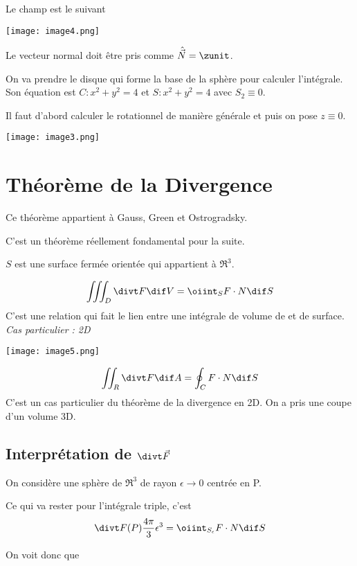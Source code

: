 Le champ est le suivant
\begin{center}

\texttt{[image: image4.png]}\\
\end{center}
Le vecteur normal doit être pris comme $\hat{\vec N} = \zunit$.

On va prendre le disque qui forme la base de la sphère pour calculer l'intégrale. Son équation est $C : x^2 + y^2 = 4 $  et $S : x^2 + y^2 = 4 $ avec $S_2 \equiv 0 $.


Il faut d'abord calculer le rotationnel de manière générale et puis on pose $z\equiv 0$.

\texttt{[image: image3.png]}\\

\section{Théorème de la Divergence}
Ce théorème appartient à Gauss, Green et Ostrogradsky.

C'est un théorème réellement fondamental pour la suite. %

$S$ est une surface fermée orientée qui appartient à $\Re^3$.

\[\iiint_D \divt F \dif V = \oiint_S F \cdot N \dif S\]
C'est une relation qui fait le lien entre une intégrale de volume de et de surface.
\textit{
Cas particulier : 2D}

\begin{center}
\texttt{[image: image5.png]}\\

\end{center}

\[\iint _R \divt F \dif A = \oint _C F \cdot N \dif S\]
C'est un cas particulier du théorème de la divergence en 2D. On a pris une coupe d'un volume 3D.

\subsection{Interprétation de $\divt \vec F$}

On considère une sphère de $\Re ^3$ de rayon $\epsilon \to 0$ centrée en P.

Ce qui va rester pour l'intégrale triple, c'est
\[\divt F(P) \dfrac{4\pi}{3} \epsilon^3 = \oiint _{S_{\epsilon}} F \cdot N \dif S \]

On voit donc que

